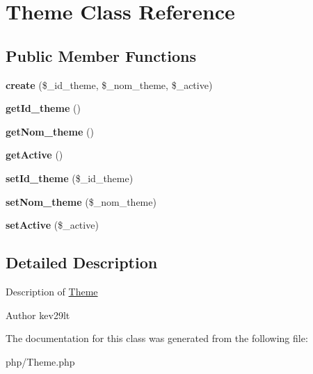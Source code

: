\hypertarget{class_theme}{}\section{Theme Class Reference}
\label{class_theme}
\subsection*{Public Member Functions}
\begin{DoxyCompactItemize}
\item 
\mbox{\label{class_theme_ac0b11dd60b26698a7ab1bbfa1dbffe7c}} 
{\bfseries create} (\$\+\_\+id\+\_\+theme, \$\+\_\+nom\+\_\+theme, \$\+\_\+active)
\item 
\mbox{\label{class_theme_aa6130b6e2174952ddab6a82945b4cc94}} 
{\bfseries get\+Id\+\_\+theme} ()
\item 
\mbox{\label{class_theme_a09627ef776e74fcd5ee9f695aaeae2e5}} 
{\bfseries get\+Nom\+\_\+theme} ()
\item 
\mbox{\label{class_theme_af9a93395c78e42f0b728d62326e42feb}} 
{\bfseries get\+Active} ()
\item 
\mbox{\label{class_theme_ace5c32652a4480e28814b02809505c3d}} 
{\bfseries set\+Id\+\_\+theme} (\$\+\_\+id\+\_\+theme)
\item 
\mbox{\label{class_theme_a366cbf00ba07b8d1b1f335904d3c50e7}} 
{\bfseries set\+Nom\+\_\+theme} (\$\+\_\+nom\+\_\+theme)
\item 
\mbox{\label{class_theme_a3ec090416b4d5b58381c856e81c9839a}} 
{\bfseries set\+Active} (\$\+\_\+active)
\end{DoxyCompactItemize}


\subsection{Detailed Description}
Description of \mbox{\hyperlink{class_theme}{Theme}}

\begin{DoxyAuthor}{Author}
kev29lt 
\end{DoxyAuthor}


The documentation for this class was generated from the following file\+:\begin{DoxyCompactItemize}
\item 
php/Theme.\+php\end{DoxyCompactItemize}
